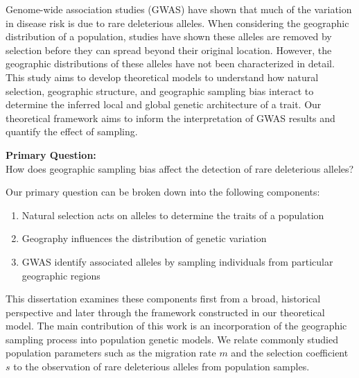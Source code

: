 \abstract
Genome-wide association studies (GWAS) have shown that much of the variation in disease risk is due to rare deleterious alleles. When considering the geographic distribution of a population, studies have shown these alleles are removed by selection before they can spread beyond their original location. However, the geographic distributions of these alleles have not been characterized in detail. This study aims to develop theoretical models to understand how natural selection, geographic structure, and geographic sampling bias interact to determine the inferred local and global genetic architecture of a trait. Our theoretical framework aims to inform the interpretation of GWAS results and quantify the effect of sampling.

\begin{center}
    \textbf{Primary Question:} \\
    How  does geographic sampling bias affect the detection of rare deleterious alleles?
\end{center}


Our primary question can be broken down into the following components:

\begin{enumerate}
    \item Natural selection acts on alleles to determine the traits of a population
    \item Geography influences the distribution of genetic variation 
    \item GWAS identify associated alleles by sampling individuals from particular geographic regions
\end{enumerate}

This dissertation examines these components first from a broad, historical perspective and later through the framework constructed in our theoretical model. The main contribution of this work is an incorporation of the geographic sampling process into population genetic models. We relate commonly studied population parameters such as the migration rate $m$ and the selection coefficient $s$ to the observation of rare deleterious alleles from population samples.     